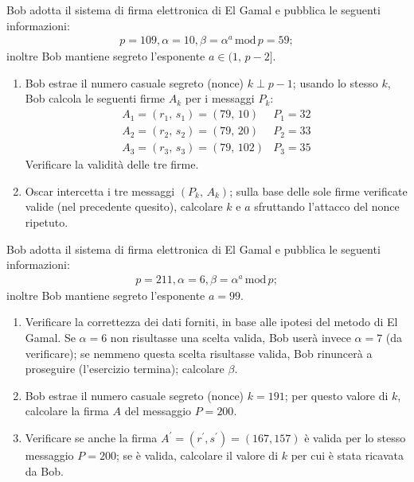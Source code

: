         Bob adotta il sistema di firma elettronica di El Gamal e pubblica le seguenti informazioni:
        \begin{gather*}
            p=109, \alpha = 10, \beta = \alpha^a\,\mathrm{mod}\,p=59
        ;\end{gather*}
        inoltre Bob mantiene segreto l'esponente $a\in (1,\,p-2]$.
        \begin{enumerate}
            \item Bob estrae il numero casuale segreto (nonce) $k\perp p-1$; usando lo stesso $k$, 
                Bob calcola le seguenti firme $A_k$ per i messaggi $P_k$:
                \[\begin{array}{ll}
                    A_1=(r_1,\,s_1)=(79,\,10) & P_1=32\\
                    A_2=(r_2,\,s_2)=(79,\,20) & P_2=33\\
                    A_3=(r_3,\,s_3)=(79,\,102) & P_3=35
                \end{array}\]
                Verificare la validità delle tre firme.
            \item Oscar intercetta i tre messaggi $(P_k,\,A_k)$; sulla base delle sole firme verificate valide 
                (nel precedente quesito), calcolare $k$ e $a$ sfruttando l'attacco del nonce ripetuto.
        \end{enumerate}

        Bob adotta il sistema di firma elettronica di El Gamal e pubblica le seguenti informazioni:
        \begin{gather*}
            p=211, \alpha = 6, \beta = \alpha^a\,\mathrm{mod}\,p
        ;\end{gather*}
        inoltre Bob mantiene segreto l'esponente $a=99$.
        \begin{enumerate}
            \item Verificare la correttezza dei dati forniti, in base alle ipotesi del metodo di El Gamal. 
                Se $\alpha=6$ non risultasse una scelta valida, Bob userà invece $\alpha=7$ (da verificare); 
                se nemmeno questa scelta risultasse valida, Bob rinuncerà a proseguire (l'esercizio termina); 
                calcolare $\beta$.
            \item Bob estrae il numero casuale segreto (nonce) $k=191$; per questo valore di $k$, calcolare 
                la firma $A$ del messaggio $P=200$.
            \item Verificare se anche la firma $A^{\prime}=(r^{\prime}, s^{\prime})=(167,157)$ è valida per 
                lo stesso messaggio $P=200$; se è valida, calcolare il valore di $k$ per cui è stata ricavata da Bob.
        \end{enumerate}

